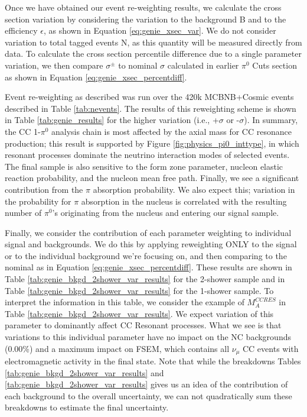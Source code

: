 \documentclass{article}
\begin{document}
\par Once we have obtained our event re-weighting results, we calculate the cross section variation by considering the variation to the background B and to the efficiency $\epsilon$, as shown in Equation \ref{eq:genie_xsec_var}. We do not consider variation to total tagged events N, as this quantity will be measured directly from data.  To calculate the cross section percentile difference due to a single parameter variation, we then compare $\sigma^\pm$ to nominal $\sigma$ calculated in earlier $\pi^0$ Cuts section as shown in Equation \ref{eq:genie_xsec_percentdiff}.

\par Event re-weighting as described was run over the 420k MCBNB+Cosmic events described in Table \ref{tab:nevents}. The results of this reweighting scheme is shown in Table \ref{tab:genie_results} for the higher variation (i.e., +$\sigma$ or -$\sigma$). In summary, the CC 1-$\pi^0$ analysis chain is most affected by the axial mass for CC resonance production;  this result is supported by Figure \ref{fig:physics_pi0_inttype}, in which resonant processes dominate the neutrino interaction modes of selected events. The final sample is also sensitive to the form zone parameter, nucleon elastic reaction probability, and the nucleon mean free path.   Finally, we see a significant contribution from the $\pi$ absorption probability. We also expect this; variation in the probability for $\pi$ absorption in the nucleus is correlated with the resulting number of $\pi^0$'s originating from the nucleus and entering our signal sample.  

\par Finally, we consider the contribution of each parameter weighting to individual signal and backgrounds.  We do this by applying reweighting ONLY to the signal or to the individual  background we're focusing on, and then comparing to the nominal as in Equation \ref{eq:genie_xsec_percentdiff}. These results are shown in Table \ref{tab:genie_bkgd_2shower_var_results} for the 2-shower sample and in Table \ref{tab:genie_bkgd_2shower_var_results} for the 1-shower sample. To interpret the information in this table, we consider the example of $M_A^{CCRES}$ in Table \ref{tab:genie_bkgd_2shower_var_results}. We expect variation of this parameter to dominantly affect CC Resonant processes.  What we see is that variations to this individual parameter have no impact on the NC backgrounds (0.00\%) and a maximum impact on FSEM, which contains all $\nu_\mu$ CC events with electromagnetic activity in the final state. 
Note that while the breakdowns Tables \ref{tab:genie_bkgd_2shower_var_results} and \ref{tab:genie_bkgd_2shower_var_results} gives us an idea of the contribution of each background to the overall uncertainty, we can not quadratically sum these breakdowns to estimate the final uncertainty. 
\end{document}
